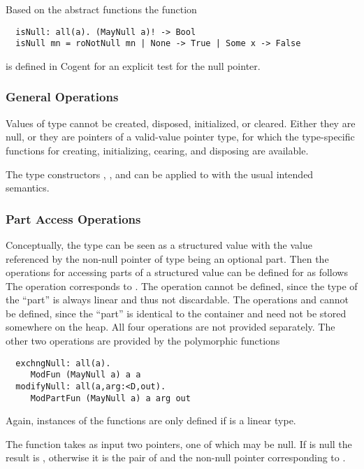 Based on the abstract functions the function
\begin{verbatim}
  isNull: all(a). (MayNull a)! -> Bool
  isNull mn = roNotNull mn | None -> True | Some x -> False
\end{verbatim}
is defined in Cogent for an explicit test for the null pointer.

\subsubsection{General Operations}

Values of type  cannot be created, disposed, initialized, or cleared. Either they are null, or they are pointers of
a valid-value pointer type, for which the type-specific functions for creating, initializing, cearing, and disposing are available.

The type constructors , , and  can be applied to  with the usual intended
semantics.

\subsubsection{Part Access Operations}

Conceptually, the type  can be seen as a structured value with the value referenced by the non-null pointer of type  being
an optional part. Then the operations for accessing parts of a structured value can be defined for  as follows
The operation  corresponds to . The operation  cannot be defined, since the type  of the 
``part'' is always linear and thus not discardable. The operations  and  cannot be defined, since
the ``part'' is identical to the container and need not be stored somewhere on the heap. 
All four operations are not provided separately. The other two operations are provided
by the polymorphic functions
\begin{verbatim}
  exchngNull: all(a).
     ModFun (MayNull a) a a
  modifyNull: all(a,arg:<D,out).
     ModPartFun (MayNull a) a arg out
\end{verbatim}
Again, instances of the functions are only defined if  is a linear type. 

The function  takes as input two pointers, one of which may be null. If  is null the result is
, otherwise it is the pair of  and the non-null pointer corresponding to .

